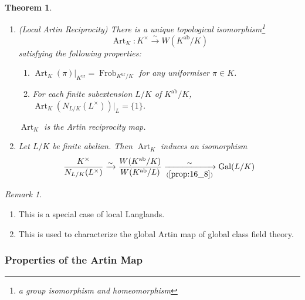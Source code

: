 \documentclass[11pt]{article}
\theoremstyle{definition}
\theoremstyle{plain}
\newtheorem{theorem}[definition]{Theorem}
\theoremstyle{remark}
\newtheorem*{remark}{Remark}
\DeclareMathOperator{\Gal}{Gal}
\DeclareMathOperator{\Frob}{Frob}
\DeclareMathOperator{\Art}{Art}
\newcommand{\ab}{\mathrm{ab}}
\newcommand{\ur}{\mathrm{ur}}
\begin{document}
\begin{theorem}\label{thm:17_2}\phantom{}
    \begin{enumerate}[label=(\arabic*)]
        \item (Local Artin Reciprocity) There is a unique topological isomorphism\footnote{a group isomorphism and homeomorphism}
            \begin{equation*}
                \Art_K : K^\times \xrightarrow{\sim} W(K^\ab/K)
            \end{equation*}
            satisfying the following properties:
            \begin{enumerate}[label=(\roman*)]
                \item $\Art_K(\pi) \vert_{K^\ur} = \Frob_{K^\ur/K}$ for any uniformiser $\pi \in K$.
                \item For each finite subextension $L/K$ of $K^\ab/K$, $\Art_K(N_{L/K}(L^\times)) \vert_L = \{1\}$.
            \end{enumerate}
            $\Art_K$ is the \emph{Artin reciprocity map}.

        \item Let $L/K$ be finite abelian. Then $\Art_K$ induces an isomorphism
            \begin{equation*}
                \frac{K^\times}{N_{L/K}(L^\times)} \xrightarrow{\sim} \frac{W(K^\ab/K)}{W(K^\ab/L)} \xrightarrow[(\ref{prop:16_8})]{\sim} \Gal(L/K)
            \end{equation*}
    \end{enumerate}
\end{theorem}

\begin{remark}\phantom{}
    \begin{enumerate}
        \item This is a special case of local Langlands.
        \item This is used to characterize the global Artin map of global class field theory.
    \end{enumerate}
\end{remark}

\subsubsection*{Properties of the Artin Map}
\end{document}
